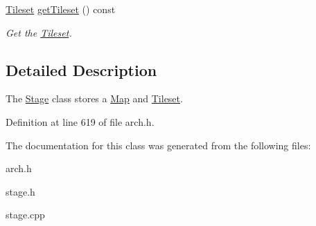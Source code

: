 \begin{DoxyCompactItemize}
\item 
\hyperlink{classTileset}{Tileset} \hyperlink{classStage_a7c41f0bf5dcdac398169c5a2e92196f3}{get\+Tileset} () const \hypertarget{classStage_a7c41f0bf5dcdac398169c5a2e92196f3}{}\label{classStage_a7c41f0bf5dcdac398169c5a2e92196f3}

\begin{DoxyCompactList}\small\item\em Get the \hyperlink{classTileset}{Tileset}. \end{DoxyCompactList}\end{DoxyCompactItemize}


\subsection{Detailed Description}
The \hyperlink{classStage}{Stage} class stores a \hyperlink{classMap}{Map} and \hyperlink{classTileset}{Tileset}. 

Definition at line 619 of file arch.\+h.



The documentation for this class was generated from the following files\+:\begin{DoxyCompactItemize}
\item 
arch.\+h\item 
stage.\+h\item 
stage.\+cpp\end{DoxyCompactItemize}

